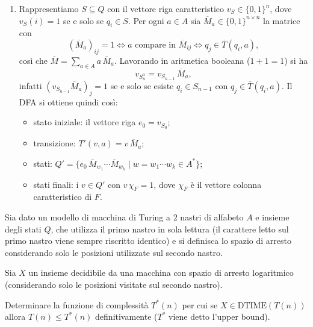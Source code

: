 \begin{sol}
\begin{enumerate}
    \item Rappresentiamo $S\subseteq Q$ con il vettore riga caratteristico $v_S\in\{0,1\}^n$, dove $v_S(i)=1$ se e solo se $q_i\in S$. Per ogni $a\in A$ sia $\overline M_a\in\{0,1\}^{n\times n}$ la matrice con
    \[
    (\overline M_a)_{ij}=1\iff a \text{ compare in } \overline M_{ij}\iff q_j\in\overline T(q_i,a),
    \]
    così che $\overline M=\sum_{a\in A}a\,\overline M_a$. Lavorando in aritmetica booleana ($1+1=1$) si ha
    \[
    v_{S_n^a}=v_{S_{n-1}}\,\overline M_a,
    \]
    infatti $(v_{S_{n-1}}\overline M_a)_j=1$ se e solo se esiste $q_i\in S_{n-1}$ con $q_j\in\overline T(q_i,a)$. Il DFA si ottiene quindi così:
    \begin{itemize}
        \item stato iniziale: il vettore riga $e_0=v_{S_0}$;
        \item transizione: $T'(v,a)=v\,\overline M_a$;
        \item stati: $Q'=\{e_0\,\overline M_{w_1}\cdots\overline M_{w_k}\mid w=w_1\cdots w_k\in A^*\}$;
        \item stati finali: i $v\in Q'$ con $v\,\chi_F=1$, dove $\chi_F$ è il vettore colonna caratteristico di $F$.
    \end{itemize}
\end{enumerate}
\end{sol}
\newpage

\begin{ex}
Sia dato un modello di macchina di Turing a $2$ nastri di alfabeto $A$ e insieme degli stati $Q$, che utilizza il primo nastro in sola lettura (il carattere letto sul primo nastro viene sempre riscritto identico) e si definisca lo spazio di arresto considerando solo le posizioni utilizzate sul secondo nastro.

Sia $X$ un insieme decidibile da una macchina con spazio di arresto logaritmico (considerando solo le posizioni visitate sul secondo nastro).

Determinare la funzione di complessità $T^*(n)$ per cui se $X\in\mathrm{DTIME}(T(n))$ allora $T(n)\le T^*(n)$ definitivamente ($T^*$ viene detto l'upper bound).
\end{ex}

